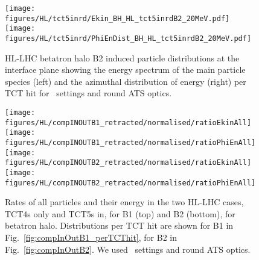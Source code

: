 \begin{figure}
\begin{center}
\texttt{[image: figures/HL/tct5inrd/Ekin\_BH\_HL\_tct5inrdB2\_20MeV.pdf]}
\texttt{[image: figures/HL/tct5inrd/PhiEnDist\_BH\_HL\_tct5inrdB2\_20MeV.pdf]}
\end{center}
\vspace{-0.6cm}
 \caption{HL-LHC betatron halo B2 induced particle distributions at the interface plane showing the energy spectrum of the main particle species (left) and the azimuthal distribution of energy (right) per TCT hit for \twosigmaret~settings and round ATS optics.}
  \label{tct5inrdb2retr}
\end{figure}



\begin{figure}
\centering
\texttt{[image: figures/HL/compINOUTB1\_retracted/normalised/ratioEkinAll]}
\texttt{[image: figures/HL/compINOUTB1\_retracted/normalised/ratioPhiEnAll]}
\texttt{[image: figures/HL/compINOUTB2\_retracted/normalised/ratioEkinAll]}
\texttt{[image: figures/HL/compINOUTB2\_retracted/normalised/ratioPhiEnAll]}
\caption{Rates of all particles and their energy in the two HL-LHC cases, TCT4s only and TCT5s in, for B1 (top) and B2 (bottom), for betatron halo. Distributions per TCT hit are shown for B1 in Fig.~\ref{fig:compInOutB1_perTCThit}, for B2 in Fig.~\ref{fig:compInOutB2}. We used \twosigmaret~settings and round ATS optics.
  \label{fig:compInOut}}
\end{figure}




